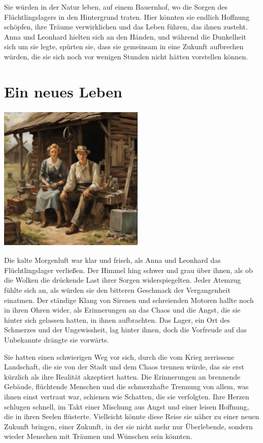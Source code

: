 \documentclass[
]{article}
\begin{document}
Sie würden in der Natur leben, auf einem Bauernhof, wo die Sorgen des
Flüchtlingslagers in den Hintergrund traten. Hier könnten sie endlich
Hoffnung schöpfen, ihre Träume verwirklichen und das Leben führen, das
ihnen zusteht. Anna und Leonhard hielten sich an den Händen, und während
die Dunkelheit sich um sie legte, spürten sie, dass sie gemeinsam in
eine Zukunft aufbrechen würden, die sie sich noch vor wenigen Stunden
nicht hätten vorstellen können.

\section{Ein neues Leben}\label{ein-neues-leben}

\includegraphics[width=2.73958in,height=2.77083in]{media/image0007.png}

Die kalte Morgenluft war klar und frisch, als Anna und Leonhard das
Flüchtlingslager verließen. Der Himmel hing schwer und grau über ihnen,
als ob die Wolken die drückende Last ihrer Sorgen widerspiegelten. Jeder
Atemzug fühlte sich an, als würden sie den bitteren Geschmack der
Vergangenheit einatmen. Der ständige Klang von Sirenen und schreienden
Motoren hallte noch in ihren Ohren wider, als Erinnerungen an das Chaos
und die Angst, die sie hinter sich gelassen hatten, in ihnen
aufbrachten. Das Lager, ein Ort des Schmerzes und der Ungewissheit, lag
hinter ihnen, doch die Vorfreude auf das Unbekannte drängte sie
vorwärts.

Sie hatten einen schwierigen Weg vor sich, durch die vom Krieg
zerrissene Landschaft, die sie von der Stadt und dem Chaos trennen
würde, das sie erst kürzlich als ihre Realität akzeptiert hatten. Die
Erinnerungen an brennende Gebäude, flüchtende Menschen und die
schmerzhafte Trennung von allem, was ihnen einst vertraut war, schienen
wie Schatten, die sie verfolgten. Ihre Herzen schlugen schnell, im Takt
einer Mischung aus Angst und einer leisen Hoffnung, die in ihren Seelen
flüsterte. Vielleicht könnte diese Reise sie näher zu einer neuen
Zukunft bringen, einer Zukunft, in der sie nicht mehr nur Überlebende,
sondern wieder Menschen mit Träumen und Wünschen sein könnten.
\end{document}
